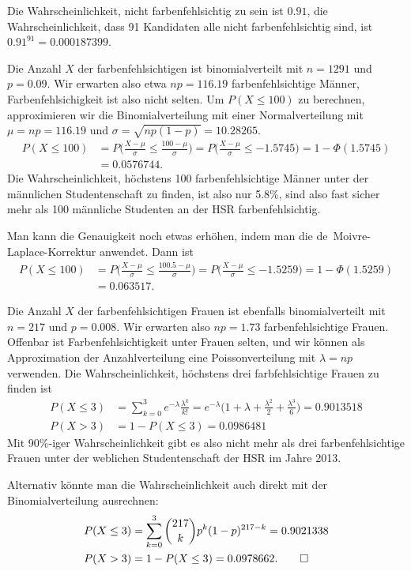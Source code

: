 \begin{loesung}
\begin{teilaufgaben}
\item
Die Wahrscheinlichkeit, nicht farbenfehlsichtig zu sein ist $0.91$, die
Wahrscheinlichkeit, dass 91 Kandidaten alle nicht farbenfehlsichtig sind,
ist $0.91^{91}=0.000187399$.
\item
Die Anzahl $X$ der farbenfehlsichtigen ist binomialverteilt mit $n=1291$ und
$p=0.09$. Wir erwarten also etwa $np=116.19$ farbenfehlsichtige Männer,
Farbenfehlsichigkeit ist also nicht selten. Um $P(X\le 100)$ zu
berechnen, approximieren wir die Binomialverteilung mit einer Normalverteilung
mit $\mu=np=116.19$ und $\sigma=\sqrt{np(1-p)}=10.28265$.
\begin{align*}
P(X\le 100)
&=
P\biggl(
\frac{X-\mu}{\sigma}\le \frac{100-\mu}{\sigma}
\biggr)
=
P\biggl(
\frac{X-\mu}{\sigma}\le -1.5745
\biggr)
=
1-\Phi(1.5745)
\\
&=
0.0576744.
\end{align*}
Die Wahrscheinlichkeit, höchstens 100 farbenfehlsichtige Männer unter
der männlichen Studentenschaft zu finden, ist also nur 5.8\%, sind
also fast sicher mehr als 100 männliche Studenten an der HSR
farbenfehlsichtig.

Man kann die Genauigkeit noch etwas erhöhen, indem man die de~Moivre-Laplace-Korrektur anwendet.
Dann ist
\begin{align*}
P(X\le 100)
&=
P\biggl(
\frac{X-\mu}{\sigma}\le \frac{100.5-\mu}{\sigma}
\biggr)
=
P\biggl(
\frac{X-\mu}{\sigma}\le -1.5259
\biggr)
=
1-\Phi(1.5259)
\\
&=
0.063517.
\end{align*}

\item
Die Anzahl $X$ der farbenfehlsichtigen Frauen ist ebenfalls binomialverteilt
mit $n=217$ und $p=0.008$. Wir erwarten also $np=1.73$ farbenfehlsichtige
Frauen. Offenbar ist Farbenfehlsichtigkeit unter Frauen selten, und wir
können als Approximation der Anzahlverteilung eine Poissonverteilung mit
$\lambda = np$ verwenden.
Die Wahrscheinlichkeit, höchstens drei farbfehlsichtige Frauen zu finden
ist
\begin{align*}
P(X\le 3)&=\sum_{k=0}^3 e^{-\lambda}\frac{\lambda^k}{k!}=
e^{-\lambda}\biggl(
1+\lambda +\frac{\lambda^2}{2}+\frac{\lambda^3}{6}
\biggr)
=
0.9013518
\\
P(X>3)&=1-P(X\le 3)=
0.0986481
\end{align*}
Mit 90\%-iger Wahrscheinlichkeit gibt es also nicht mehr als drei
farbenfehlsichtige Frauen unter der weblichen Studentenschaft
der HSR im Jahre 2013.

Alternativ könnte man die Wahrscheinlichkeit auch direkt mit der 
Binomialverteilung ausrechnen:
\begin{align*}
P(X\le 3)
&=
\sum_{k=0}^3\binom{217}{k}p^k(1-p)^{217-k}=0.9021338
\\
P(X>3)&=1-P(X\le 3)=0.0978662.
\qedhere
\end{align*}
\end{teilaufgaben}
\end{loesung}

